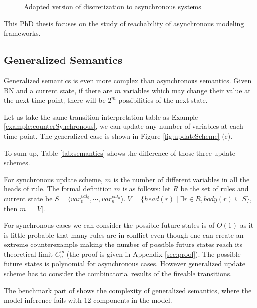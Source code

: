 \begin{figure}[ht]
    \centering
    
    \caption[Discretization]{Adapted version of discretization to asynchronous systems}
    \label{fig:discretization}
\end{figure}


This PhD thesis focuses on the study of reachability of asynchronous modeling frameworks.

\subsection{Generalized Semantics}
Generalized semantics is even more complex than asynchronous semantics.
Given BN and a current state, if there are $m$ variables which may change their value at the next time point, there will be $2^m$ possibilities of the next state.

\begin{example}
Let us take the same transition interpretation table as Example \ref{example:counterSynchronous}, we can update any number of variables at each time point.
The generalized case is shown in Figure \ref{fig:updateScheme} (c).
\end{example}

To sum up, Table \ref{tab:semantics} shows the difference of those three update schemes.

For synchronous update scheme, $m$ is the number of different variables in all the heads of rule.
The formal definition $m$ is as follows:
let $R$ be the set of rules and current state be $S=\langle var_0^{val_0},\cdots, var_n^{val_n}\rangle$. 
$V=\{head(r)\mid \exists r\in R, body(r)\subseteq S\}$, then $m=|V|$.

For synchronous cases we can consider the possible future states is of $O(1)$ as it is little probable that many rules are in conflict even though one can create an extreme counterexample making the number of possible future states reach its theoretical limit $C_n^m$ (the proof is given in Appendix \ref{sec:proof}).
The possible future states is polynomial for asynchronous cases.
However generalized update scheme has to consider the combinatorial results of the fireable transitions.

The benchmark part of \cite{ribeiro2018learning} shows the complexity of generalized semantics, where the model inference fails with 12 components in the model. 

